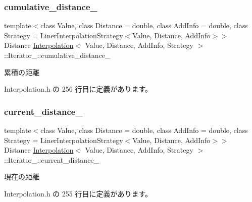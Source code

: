\subsubsection{\texorpdfstring{cumulative\+\_\+distance\+\_\+}{cumulative\_distance\_}}
{\footnotesize\ttfamily template$<$class Value, class Distance = double, class Add\+Info = double, class Strategy = Liner\+Interpolation\+Strategy$<$\+Value, Distance, Add\+Info$>$$>$ \\
Distance \mbox{\hyperlink{class_interpolation}{Interpolation}}$<$ Value, Distance, Add\+Info, Strategy $>$\+::Iterator\+\_\+\+::cumulative\+\_\+distance\+\_\+\hspace{0.3cm}{\ttfamily [private]}}



累積の距離 



 Interpolation.\+h の 256 行目に定義があります。

\mbox{\label{class_interpolation_1_1_iterator___aa15b1800d74b447f44844b69584f3bcc}} 
\subsubsection{\texorpdfstring{current\+\_\+distance\+\_\+}{current\_distance\_}}
{\footnotesize\ttfamily template$<$class Value, class Distance = double, class Add\+Info = double, class Strategy = Liner\+Interpolation\+Strategy$<$\+Value, Distance, Add\+Info$>$$>$ \\
Distance \mbox{\hyperlink{class_interpolation}{Interpolation}}$<$ Value, Distance, Add\+Info, Strategy $>$\+::Iterator\+\_\+\+::current\+\_\+distance\+\_\+\hspace{0.3cm}{\ttfamily [private]}}



現在の距離 



 Interpolation.\+h の 255 行目に定義があります。

\mbox{\label{class_interpolation_1_1_iterator___a436aa805d692156f4cbce6000077e241}} 
